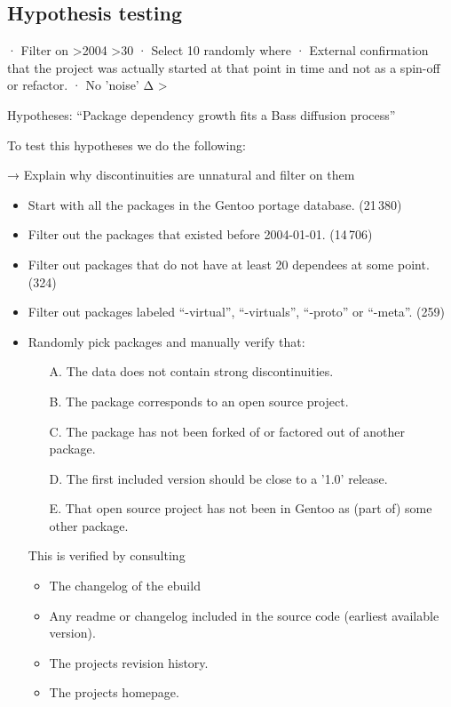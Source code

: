 \documentclass[smallextended,final]{svjour3}
\begin{document}
\subsection{Hypothesis testing}

· Filter on >2004  >30
· Select 10 randomly where
	· External confirmation that the project was actually started at that point in time and not as a spin-off or refactor.
	· No 'noise' Δ > 

Hypotheses: “Package dependency growth fits a Bass diffusion process”

To test this hypotheses we do the following: 

→ Explain why discontinuities are unnatural and filter on them

\begin{itemize}
	\item Start with all the packages in the Gentoo portage database. (21\,380)
	\item Filter out the packages that existed before 2004-01-01. (14\,706)
	\item Filter out packages that do not have at least 20 dependees at some point. (324)
	\item Filter out packages labeled “-virtual”, “-virtuals”, “-proto” or “-meta”. (259)
	\item Randomly pick packages and manually verify that:
	\begin{enumerate}
		\item[A.] The data does not contain strong discontinuities.
		\item[B.] The package corresponds to an open source project.
		\item[C.] The package has not been forked of or factored out of another package.
		\item[D.] The first included version should be close to a '1.0' release.
		\item[E.] That open source project has not been in Gentoo as (part of) some other package.
	\end{enumerate}
	This is verified by consulting
	\begin{itemize}
		\item The changelog of the ebuild
		\item Any readme or changelog included in the source code (earliest available version).
		\item The projects revision history.
		\item The projects homepage.
	\end{itemize}
\end{itemize}
\end{document}
